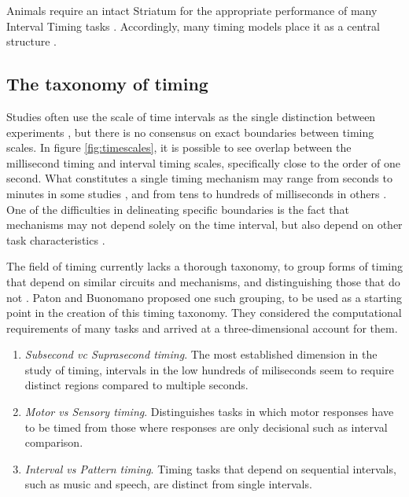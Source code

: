         Animals require an intact Striatum for the appropriate performance of many Interval Timing tasks \cite{mello2015scalable,gouvea2015striatal,cho2010differential}. Accordingly, many timing models place it as a central structure \cite{mello2015scalable, buhusi2005makes}.
        
    \subsection{The taxonomy of timing}
    \label{sub:taxonomy}
    

        Studies often use the scale of time intervals as the single distinction between experiments \cite{van20168, buhusi2005makes, hardy2016neurocomputational}, but there is no consensus on exact boundaries between timing scales. In figure \ref{fig:timescales}, it is possible to see overlap between the millisecond timing and interval timing scales, specifically close to the order of one second. What constitutes a single timing mechanism may range from seconds to minutes in some studies \cite{mello2015scalable}, and from tens to hundreds of milliseconds in others \cite{mauk2004neural}. One of the difficulties in delineating specific boundaries is the fact that mechanisms may not depend solely on the time interval, but also depend on other task characteristics \cite{lewis2003distinct}.
        
        The field of timing currently lacks a thorough taxonomy, to group forms of timing that depend on similar circuits and mechanisms, and distinguishing those that do not \cite{paton2018neural}. Paton and Buonomano \cite{paton2018neural} proposed one such grouping, to be used as a starting point in the creation of this timing taxonomy. They considered the computational requirements of many tasks and arrived at a three-dimensional account for them.
        \begin{enumerate}
            \item \textit{Subsecond vc Suprasecond timing}. The most established dimension in the study of timing, intervals in the low hundreds of miliseconds seem to require distinct regions compared to multiple seconds. 
            \item \textit{Motor vs Sensory timing}. Distinguishes tasks in which motor responses have to be timed from those where responses are only decisional such as interval comparison.
            \item \textit{Interval vs Pattern timing}. Timing tasks that depend on sequential intervals, such as music and speech, are distinct from single intervals.
        \end{enumerate}
        
